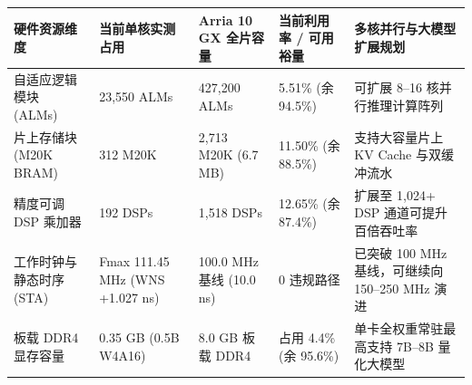 \documentclass[11pt,a4paper]{article}
\begin{document}
{\footnotesize\renewcommand{\arraystretch}{1.14}\begin{longtable}{@{}L{0.19\textwidth}L{0.16\textwidth}L{0.16\textwidth}L{0.15\textwidth}L{0.24\textwidth}@{}}\toprule

\textbf{硬件资源维度} & \textbf{当前单核实测占用} & \textbf{Arria 10 GX 全片容量} & \textbf{当前利用率 /\allowbreak{} 可用裕量} & \textbf{多核并行与大模型扩展规划}\\\midrule\endhead

自适应逻辑模块 (\allowbreak{}ALMs)\allowbreak{} & 23,\allowbreak{}550 ALMs & 427,\allowbreak{}200 ALMs & 5.51\% (\allowbreak{}余 94.5\%)\allowbreak{} & 可扩展 8–16 核并行推理计算阵列\\[2pt]

片上存储块 (\allowbreak{}M20K BRAM)\allowbreak{} & 312 M20K & 2,\allowbreak{}713 M20K (\allowbreak{}6.7 MB)\allowbreak{} & 11.50\% (\allowbreak{}余 88.5\%)\allowbreak{} & 支持大容量片上 KV Cache 与双缓冲流水\\[2pt]

精度可调 DSP 乘加器 & 192 DSPs & 1,\allowbreak{}518 DSPs & 12.65\% (\allowbreak{}余 87.4\%)\allowbreak{} & 扩展至 1,\allowbreak{}024+\allowbreak{} DSP 通道可提升百倍吞吐率\\[2pt]

工作时钟与静态时序 (\allowbreak{}STA)\allowbreak{} & Fmax 111.45 MHz (\allowbreak{}WNS +\allowbreak{}1.027 ns)\allowbreak{} & 100.0 MHz 基线 (\allowbreak{}10.0 ns)\allowbreak{} & 0 违规路径 & 已突破 100 MHz 基线，可继续向 150–250 MHz 演进\\[2pt]

板载 DDR4 显存容量 & 0.35 GB (\allowbreak{}0.5B W4A16)\allowbreak{} & 8.0 GB 板载 DDR4 & 占用 4.4\% (\allowbreak{}余 95.6\%)\allowbreak{} & 单卡全权重常驻最高支持 7B–8B 量化大模型\\[2pt]

\bottomrule\end{longtable}}
\end{document}
